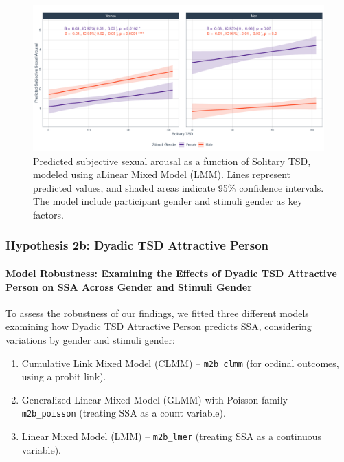 \documentclass[
  bookmarksnumbered]{article}
\providecommand{\tightlist}{%
  \setlength{\itemsep}{0pt}\setlength{\parskip}{0pt}}
\begin{document}
\begin{figure}
\centering
\includegraphics{Sexual_Desire_Arousal_files/figure-latex/fig-h2a-1.pdf}
\caption{\label{fig:fig-h2a}Predicted subjective sexual arousal as a function of Solitary TSD, modeled using aLinear Mixed Model (LMM). Lines represent predicted values, and shaded areas indicate 95\% confidence intervals. The model include participant gender and stimuli gender as key factors.}
\end{figure}

\subsubsection{Hypothesis 2b: Dyadic TSD Attractive Person}\label{hyp2b}

\paragraph{Model Robustness: Examining the Effects of Dyadic TSD Attractive Person on SSA Across Gender and Stimuli Gender}\label{model-robustness-examining-the-effects-of-dyadic-tsd-attractive-person-on-ssa-across-gender-and-stimuli-gender}

To assess the robustness of our findings, we fitted three different models examining how Dyadic TSD Attractive Person predicts SSA, considering variations by gender and stimuli gender:

\begin{enumerate}
\def\labelenumi{\arabic{enumi}.}
\tightlist
\item
  Cumulative Link Mixed Model (CLMM) -- \texttt{m2b\_clmm} (for ordinal outcomes, using a probit link).
\item
  Generalized Linear Mixed Model (GLMM) with Poisson family -- \texttt{m2b\_poisson} (treating SSA as a count variable).
\item
  Linear Mixed Model (LMM) -- \texttt{m2b\_lmer} (treating SSA as a continuous variable).
\end{enumerate}
\end{document}
